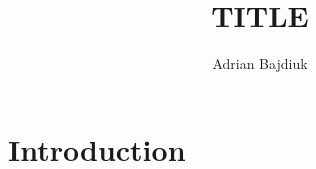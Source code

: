 \documentclass[twoside]{iisthesis}
\newcommand{\myfigure}[1]{%
\addcontentsline{figu}{myfigure}{\protect\numberline{\thefigure}#1}\par}
\begin{document}
\newcommand{\resultChart}[7][140]{
\def\dataS{{#2}}
	\begin{figure}[H]
	
\centering

\begin{center}
\begin{tikzpicture}
 
\begin{axis}[
ybar,
bar width=20,
legend style={at={(0.5,-0.25)},
anchor=north,legend columns=-1},
ylabel={Wartość miary},
symbolic x coords={\dataS},
xtick=data,
height=  {#1},
width=0.8\textwidth,
ymin=0, ytick={0,0.5,1},
ymax=1.5,
nodes near coords,
nodes near coords align={vertical},
]
\addplot coordinates { (\dataS,{#3}) };
\addplot coordinates {(\dataS,{#4}) };
\addplot coordinates { (\dataS,{#5}) };
\legend{Recall,Precission,F1-Score}
\end{axis}
\end{tikzpicture}
\end{center}
\caption{{#6}}
\myfigure{{#6}}
\label{{#7}}
\end{figure}
}


%
\nocite{*}
\title{ TITLE }
\author{Adrian Bajdiuk }

\date{\number\the\year}




\maketitle
\textpages


\graphicspath{ {img/} }

\chapter{Introduction}
\end{document}
